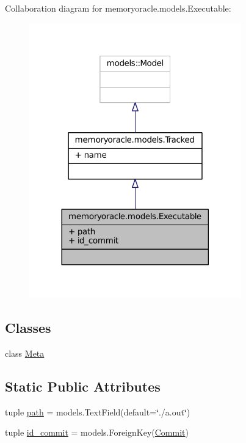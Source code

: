 Collaboration diagram for memoryoracle.\+models.\+Executable\+:\nopagebreak
\begin{figure}[H]
\begin{center}
\leavevmode
\includegraphics[width=260pt]{classmemoryoracle_1_1models_1_1Executable__coll__graph}
\end{center}
\end{figure}
\subsection*{Classes}
\begin{DoxyCompactItemize}
\item 
class \hyperlink{classmemoryoracle_1_1models_1_1Executable_1_1Meta}{Meta}
\end{DoxyCompactItemize}
\subsection*{Static Public Attributes}
\begin{DoxyCompactItemize}
\item 
tuple \hyperlink{classmemoryoracle_1_1models_1_1Executable_a2ab97065889225c1d050784a374fab8a}{path} = models.\+Text\+Field(default=\char`\"{}./a.\+out\char`\"{})
\item 
tuple \hyperlink{classmemoryoracle_1_1models_1_1Executable_a63ec6fcf966d713361d30913dbeb2815}{id\+\_\+commit} = models.\+Foreign\+Key(\hyperlink{classmemoryoracle_1_1models_1_1Commit}{Commit})
\end{DoxyCompactItemize}


